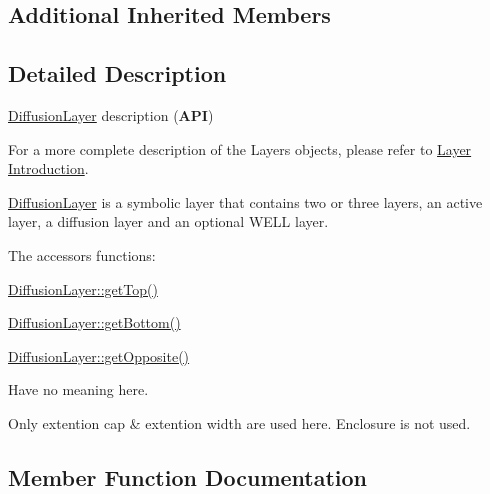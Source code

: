\subsection*{Additional Inherited Members}


\subsection{Detailed Description}
\hyperlink{classHurricane_1_1DiffusionLayer}{Diffusion\+Layer} description ({\bfseries A\+PI}) 

For a more complete description of the Layers objects, please refer to \hyperlink{classHurricane_1_1Layer_secLayerIntro}{Layer Introduction}.

\hyperlink{classHurricane_1_1DiffusionLayer}{Diffusion\+Layer} is a symbolic layer that contains two or three layers, an active layer, a diffusion layer and an optional W\+E\+LL layer.

The accessors functions\+: 
\begin{DoxyItemize}
\item \hyperlink{classHurricane_1_1Layer_a5f7c43a29f3dd02a9ebccbcbf91d6727}{Diffusion\+Layer\+::get\+Top()} 
\item \hyperlink{classHurricane_1_1Layer_a4dab4552a219d2d900ed0b1245dc6580}{Diffusion\+Layer\+::get\+Bottom()} 
\item \hyperlink{classHurricane_1_1Layer_a69e76c09a56260169c4f5c145a35a47f}{Diffusion\+Layer\+::get\+Opposite()} 
\end{DoxyItemize}Have no meaning here.

Only extention cap \& extention width are used here. Enclosure is not used. 

\subsection{Member Function Documentation}
\mbox{\label{classHurricane_1_1DiffusionLayer_a91b5f8a20b005c20b4b9b9080250939e}} 
